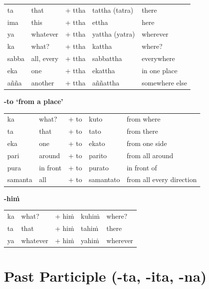 \documentclass[11pt,oneside]{memoir}
\begin{document}
\begin{center}
\begin{tabular}{lllll}
ta & that & + ttha & tattha (tatra) & there\\[0pt]
ima & this & + ttha & ettha & here\\[0pt]
ya & whatever & + ttha & yattha (yatra) & wherever\\[0pt]
ka & what? & + ttha & kattha & where?\\[0pt]
sabba & all, every & + ttha & sabbattha & everywhere\\[0pt]
eka & one & + ttha & ekattha & in one place\\[0pt]
añña & another & + ttha & aññattha & somewhere else\\[0pt]
\end{tabular}
\end{center}

\textbf{-to `from a place'}

\begin{center}
\begin{tabular}{lllll}
ka & what? & + to & kuto & from where\\[0pt]
ta & that & + to & tato & from there\\[0pt]
eka & one & + to & ekato & from one side\\[0pt]
pari & around & + to & parito & from all around\\[0pt]
pura & in front & + to & purato & in front of\\[0pt]
samanta & all & + to & samantato & from all every direction\\[0pt]
\end{tabular}
\end{center}

\textbf{-hiṁ}

\begin{center}
\begin{tabular}{lllll}
ka & what? & + hiṁ & kuhiṁ & where?\\[0pt]
ta & that & + hiṁ & tahiṁ & there\\[0pt]
ya & whatever & + hiṁ & yahiṁ & wherever\\[0pt]
\end{tabular}
\end{center}

\clearpage

\section{Past Participle (-ta, -ita, -na)}
\label{sec:org968971d}
\end{document}
